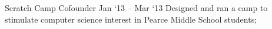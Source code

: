 \experience
    {Scratch Camp}
    {Cofounder}
    {Jan `13 -- Mar `13}
    {
        Designed and ran a camp to stimulate computer science interest in Pearce Middle School
        students;
    }
